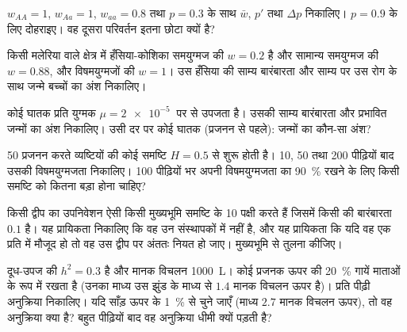 \begin{exercise}[$\star\star$]\label{exo:b2:population-genetics:6}
$w_{AA} = 1$, $w_{Aa} = 1$, $w_{aa} = 0.8$ तथा $p = 0.3$ के साथ
$\bar w$, $p'$ तथा $\Delta p$ निकालिए। $p = 0.9$ के लिए दोहराइए। वह
दूसरा परिवर्तन इतना छोटा क्यों है?
\end{exercise}

\begin{exercise}[$\star\star$]\label{exo:b2:population-genetics:7}
किसी मलेरिया वाले क्षेत्र में हँसिया-कोशिका समयुग्मज की $w = 0.2$ है और सामान्य समयुग्मज
की $w = 0.88$, और विषमयुग्मजों की $w = 1$। उस हँसिया  की
साम्य बारंबारता और साम्य पर उस रोग के साथ जन्मे बच्चों का
अंश निकालिए।
\end{exercise}

\begin{exercise}[$\star\star$]\label{exo:b2:population-genetics:8}
कोई  घातक प्रति युग्मक $\mu = \qty{2e-5}{}$ पर  से उपजता है।
उसकी साम्य बारंबारता और प्रभावित जन्मों का अंश
निकालिए। उसी दर पर कोई  घातक (प्रजनन से पहले):
जन्मों का कौन-सा अंश?
\end{exercise}

\begin{exercise}[$\star\star$]\label{exo:b2:population-genetics:9}
50 प्रजनन करते व्यष्टियों की कोई समष्टि $H = 0.5$ से शुरू होती है।
10, 50 तथा 200 पीढ़ियों बाद उसकी विषमयुग्मजता निकालिए। 100 पीढ़ियों भर
अपनी विषमयुग्मजता का \qty{90}{\%} रखने के लिए किसी समष्टि को कितना
बड़ा होना चाहिए?
\end{exercise}

\begin{exercise}[$\star\star\star$]\label{exo:b2:population-genetics:10}
किसी द्वीप का उपनिवेशन ऐसी किसी मुख्यभूमि समष्टि के 10 पक्षी करते हैं जिसमें
किसी  की बारंबारता $0.1$ है। यह प्रायिकता निकालिए कि वह
 उन संस्थापकों में नहीं है, और यह प्रायिकता कि यदि वह एक प्रति में मौजूद हो तो वह
उस द्वीप पर अंततः नियत हो जाए। मुख्यभूमि से तुलना कीजिए।
\end{exercise}

\begin{exercise}[$\star\star\star$]\label{exo:b2:population-genetics:11}
दूध-उपज की $h^{2} = 0.3$ है और मानक विचलन
\qty{1000}{L}। कोई प्रजनक ऊपर की \qty{20}{\%} गायें
माताओं के रूप में रखता है (उनका माध्य उस झुंड के माध्य से $1.4$ मानक विचलन ऊपर है)।
प्रति पीढ़ी अनुक्रिया निकालिए। यदि साँड़ ऊपर के
\qty{1}{\%} से चुने जाएँ (माध्य $2.7$ मानक विचलन ऊपर), तो वह
अनुक्रिया क्या है? बहुत पीढ़ियों बाद वह अनुक्रिया धीमी क्यों पड़ती है?
\end{exercise}

